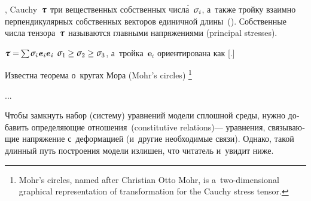 \begin{otherlanguage}{russian}

 , Cauchy~$\cauchystress$  три вещественных собственных числ\'{а}~$\mathsigma_i$, а~также тройку взаимно перпендикулярных собственных векторов единичной длины~().
Собственные числа тензора~$\cauchystress$ называются главными напряжениями (principal stresses).

 ${\cauchystress = \hspace{-0.2ex} \sum \hspace{-0.15ex} \mathsigma_i \hspace{.15ex} \bm{e}_i \bm{e}_i}$    ${\mathsigma_1 \hspace{-0.1ex} \geq \mathsigma_2 \geq \mathsigma_3}$, а~тройка~${\bm{e}_i}$ ориентирована как [.]

Известна теорема о~кругах Мора (Mohr’s circles)%
\footnote{Mohr’s circles, named after Christian Otto Mohr, is a~two-dimensional graphical representation of transformation for the Cauchy stress tensor.}

...



Чтобы замкнуть набор (систему) уравнений модели сплошной среды, нужно добавить определяющие отношения~(constitutive relations)\:--- уравнения, связывающие напряжение с~деформацией (и~другие необходимые связи). Однако,   такой длинный путь построения модели излишен, что читатель и~увидит ниже.

\end{otherlanguage}



